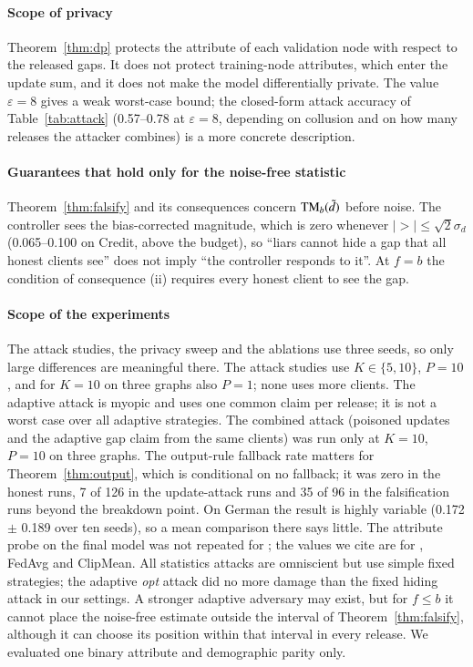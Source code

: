 \paragraph{Scope of privacy}
Theorem~\ref{thm:dp} protects the attribute of each validation node with respect to the released gaps. It does not protect training-node attributes, which enter the update sum, and it does not make the model differentially private. The value $\varepsilon=8$ gives a weak worst-case bound; the closed-form attack accuracy of Table~\ref{tab:attack} (0.57--0.78 at $\varepsilon=8$, depending on collusion and on how many releases the attacker combines) is a more concrete description.

\paragraph{Guarantees that hold only for the noise-free statistic}
Theorem~\ref{thm:falsify} and its consequences concern $\mathrm{TM}_b(\tilde d)$ before noise. The controller sees the bias-corrected magnitude, which is zero whenever $|\gt|\le\sqrt2\sigma_d$ (0.065--0.100 on Credit, above the budget), so ``liars cannot hide a gap that all honest clients see'' does not imply ``the controller responds to it''. At $f=b$ the condition of consequence (ii) requires every honest client to see the gap.

\paragraph{Scope of the experiments}
The attack studies, the privacy sweep and the ablations use three seeds, so only large differences are meaningful there. The attack studies use $K\in\{5,10\}$, $P=10$, and for $K=10$ on three graphs also $P=1$; none uses more clients. The adaptive attack is myopic and uses one common claim per release; it is not a worst case over all adaptive strategies. The combined attack (poisoned updates and the adaptive gap claim from the same clients) was run only at $K=10$, $P=10$ on three graphs. The output-rule fallback rate matters for Theorem~\ref{thm:output}, which is conditional on no fallback; it was zero in the honest runs, 7 of 126 in the update-attack runs and 35 of 96 in the falsification runs beyond the breakdown point. On German the result is highly variable (0.172 $\pm$ 0.189 over ten seeds), so a mean comparison there says little. The attribute probe on the final model was not repeated for \rt{}; the values we cite are for \clamp{}, FedAvg and ClipMean. All statistics attacks are omniscient but use simple fixed strategies; the adaptive \emph{opt} attack did no more damage than the fixed hiding attack in our settings. A stronger adaptive adversary may exist, but for $f\le b$ it cannot place the noise-free estimate outside the interval of Theorem~\ref{thm:falsify}, although it can choose its position within that interval in every release. We evaluated one binary attribute and demographic parity only.
